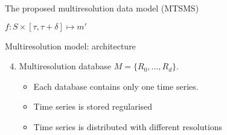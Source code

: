 \begin{frame}{The proposed multiresolution data model (MTSMS)}
\begin{textblock*}{50mm}


  $f: S \times [\tau,\tau+\delta] \mapsto m'$


   \end{textblock*}

\end{frame}




\begin{frame}{Multiresolution model: architecture}

  \begin{enumerate}
    \setcounter{enumi}{3}
  \item Multiresolution database $M=\{R_0,\ldots,R_d \}$. 
    \begin{itemize}
    \item Each  database contains only one time series.
    \item Time series is stored regularised
    \item Time series is distributed with different resolutions
    \end{itemize}
  \end{enumerate}



  \begin{center}
    
  \end{center}

\end{frame}



